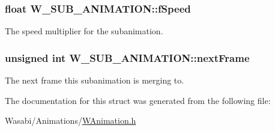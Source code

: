 \subsubsection[{\texorpdfstring{f\+Speed}{fSpeed}}]{\setlength{\rightskip}{0pt plus 5cm}float W\+\_\+\+S\+U\+B\+\_\+\+A\+N\+I\+M\+A\+T\+I\+O\+N\+::f\+Speed}\hypertarget{struct_w___s_u_b___a_n_i_m_a_t_i_o_n_a5f1a892565c32d4d6da2a98d209ce2a5}{}\label{struct_w___s_u_b___a_n_i_m_a_t_i_o_n_a5f1a892565c32d4d6da2a98d209ce2a5}
The speed multiplier for the subanimation. 
\subsubsection[{\texorpdfstring{next\+Frame}{nextFrame}}]{\setlength{\rightskip}{0pt plus 5cm}unsigned int W\+\_\+\+S\+U\+B\+\_\+\+A\+N\+I\+M\+A\+T\+I\+O\+N\+::next\+Frame}\hypertarget{struct_w___s_u_b___a_n_i_m_a_t_i_o_n_a4c308bafa17ea951fcf4486caf9f45b8}{}\label{struct_w___s_u_b___a_n_i_m_a_t_i_o_n_a4c308bafa17ea951fcf4486caf9f45b8}
The next frame this subanimation is merging to. 

The documentation for this struct was generated from the following file\+:\begin{DoxyCompactItemize}
\item 
Wasabi/\+Animations/\hyperlink{_w_animation_8h}{W\+Animation.\+h}\end{DoxyCompactItemize}
